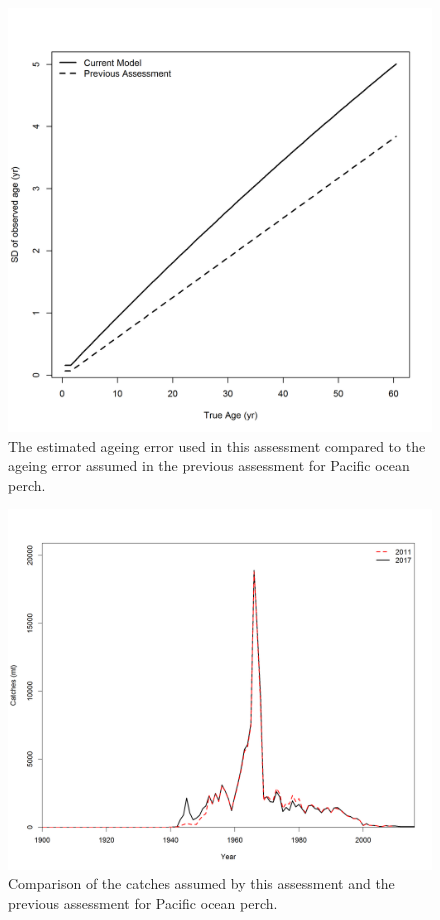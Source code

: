 \documentclass[12pt,]{article}
\begin{document}
\FloatBarrier 

\begin{figure}
\centering
\includegraphics{Figures/Ageing_Error.png}
\caption{The estimated ageing error used in this assessment compared to
the ageing error assumed in the previous assessment for Pacific ocean
perch. \label{fig:Age_Error}}
\end{figure}

\FloatBarrier 

\begin{figure}
\centering
\includegraphics{Figures/Catch_Comparison.png}
\caption{Comparison of the catches assumed by this assessment and the
previous assessment for Pacific ocean perch. \label{fig:Catch_Compare}}
\end{figure}
\end{document}
